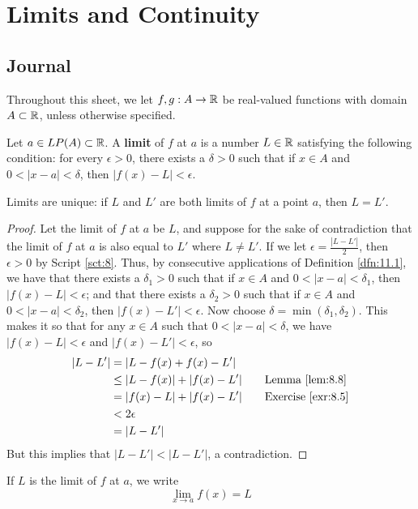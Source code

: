 \documentclass[../main.tex]{subfiles}
\begin{document}
\chapter{Limits and Continuity}\label{sct:11}
\section{Journal}
Throughout this sheet, we let $f,g:A\to\mathbb{R}$ be real-valued functions with domain $A\subset\mathbb{R}$, unless otherwise specified.
\begin{definition}\label{dfn:11.1}
    Let $a\in LP(A)\subset\mathbb{R}$. A \textbf{limit} of $f$ at $a$ is a number $L\in\mathbb{R}$ satisfying the following condition: for every $\epsilon>0$, there exists a $\delta>0$ such that if $x\in A$ and $0<|x-a|<\delta$, then $|f(x)-L|<\epsilon$.
\end{definition}

\begin{lemma}\label{lem:11.2}
    Limits are unique: if $L$ and $L'$ are both limits of $f$ at a point $a$, then $L=L'$.
    \begin{proof}
        Let the limit of $f$ at $a$ be $L$, and suppose for the sake of contradiction that the limit of $f$ at $a$ is also equal to $L'$ where $L\neq L'$. If we let $\epsilon=\frac{|L-L'|}{2}$, then $\epsilon>0$ by Script \ref{sct:8}. Thus, by consecutive applications of Definition \ref{dfn:11.1}, we have that there exists a $\delta_1>0$ such that if $x\in A$ and $0<|x-a|<\delta_1$, then $|f(x)-L|<\epsilon$; and that there exists a $\delta_2>0$ such that if $x\in A$ and $0<|x-a|<\delta_2$, then $|f(x)-L'|<\epsilon$. Now choose $\delta=\min(\delta_1,\delta_2)$. This makes it so that for any $x\in A$ such that $0<|x-a|<\delta$, we have $|f(x)-L|<\epsilon$ and $|f(x)-L'|<\epsilon$, so
        \begin{align*}
            |L-L'| &= |L-f(x)+f(x)-L'|\\
            &\leq |L-f(x)|+|f(x)-L'|\tag*{Lemma \ref{lem:8.8}}\\
            &= |f(x)-L|+|f(x)-L'|\tag*{Exercise \ref{exr:8.5}}\\
            &< 2\epsilon\\
            &= |L-L'|
        \end{align*}
        But this implies that $|L-L'|<|L-L'|$, a contradiction.
    \end{proof}
\end{lemma}

\begin{definition}\label{dfn:11.3}
    If $L$ is the limit of $f$ at $a$, we write
    \begin{equation*}
        \lim_{x\to a}f(x) = L
    \end{equation*}
\end{definition}
\end{document}
